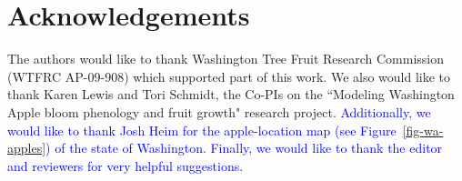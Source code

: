 \documentclass[useAMS]{cJAS2e}
\newcommand{\added}[1]{\textcolor{blue}{#1}}
\begin{document}
\section*{Acknowledgements}
The authors would like to thank Washington Tree Fruit Research Commission (WTFRC AP-09-908) which supported part of this work.  We also would like to thank Karen Lewis and Tori Schmidt, the Co-PIs on the ``Modeling Washington Apple bloom phenology and fruit growth" research project.  \added{Additionally, we would like to thank Josh Heim for the apple-location map (see Figure~\ref{fig-wa-apples}) of the state of Washington.  Finally, we would like to thank the editor and reviewers for very helpful suggestions. }



%

%








\label{lastpage}
\end{document}
